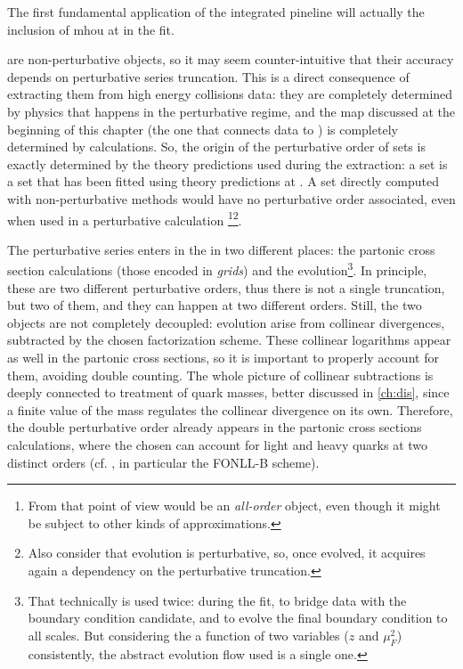 
The first fundamental application of the integrated pineline will actually the
inclusion of \acrfull{mhou} at \nnlo in the  fit.

\pdfs are non-perturbative objects, so it may seem counter-intuitive that their
accuracy depends on perturbative series truncation.
%
This is a direct consequence of extracting them from high energy collisions
data: they are completely determined by physics that happens in the
perturbative regime, and the map discussed at the beginning of this chapter
(the one that connects data to \pdfs) is completely determined by \pqft
calculations.
%
So, the origin of the perturbative order of \pdf sets is exactly determined by
the theory predictions used during the extraction: a \nnlo set is a \pdf set
that has been fitted using theory predictions at \nnlo.
%
A \pdf set directly computed with non-perturbative methods would have no
perturbative order associated, even when used in a perturbative calculation
\footnote{
	From that point of view would be an \textit{all-order} object, even though
	it might be subject to other kinds of approximations.
}\footnote{
	Also consider that \dglap evolution is perturbative, so, once evolved, it
	acquires again a dependency on the perturbative truncation.
}.

The perturbative series enters in the \pdf in two different places: the
partonic cross section calculations (those encoded in \textit{grids}) and the
\dglap evolution\footnote{
	That technically is used twice: during the fit, to bridge data with the
	boundary condition candidate, and to evolve the final boundary condition to
	all scales.
	But considering the \pdf a function of two variables ($z$ and $\mu_F^2$)
	consistently, the abstract evolution flow used is a single one.
}.
%
In principle, these are two different perturbative orders, thus there is not a
single truncation, but two of them, and they can happen at two different
orders.
%
Still, the two objects are not completely decoupled: \dglap evolution arise
from collinear divergences, subtracted by the chosen factorization scheme.
These collinear logarithms appear as well in the partonic cross sections, so it
is important to properly account for them, avoiding double counting.
%
The whole picture of collinear subtractions is deeply connected to treatment of
quark masses, better discussed in \cref{ch:dis}, since a finite value of the
mass regulates the collinear divergence on its own.
%
Therefore, the double perturbative order already appears in the partonic cross
sections calculations, where the \fns chosen can account for light and heavy
quarks at two distinct orders (cf. \cite{Forte:2010ta}, in particular the
FONLL-B scheme).

